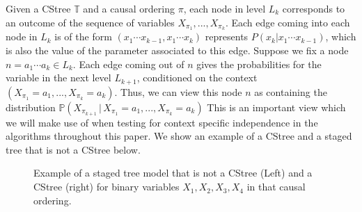 \documentclass{tufte-book}
\begin{document}
\begin{Definition}
Given a CStree \(\mathbb{T}\) and a causal ordering \(\pi\), each node in level \(L_k\) corresponds to an outcome of the sequence of variables \(X_{\pi_1},...,X_{\pi_k}\). Each edge coming into each node in \(L_k\) is of the form \((x_1\cdots x_{k-1},x_1\cdots x_k)\) represents \(P(x_{k}|x_1 \cdots x_{k-1})\), which is also the value of the parameter associated to this edge. Suppose we fix a node \(n = a_1\cdots a_k \in L_k\). Each edge coming out of \(n\) gives the probabilities for the variable in the next level \(L_{k+1}\), conditioned on the context \((X_{\pi_1}=a_1,...,X_{\pi_k}=a_k)\). Thus, we can view this node \(n\) as containing the distribution \(\mathbb{P}(X_{\pi_{k+1}}\,|\, X_{\pi_1}=a_1,...,X_{\pi_k}=a_k)\) This is an important view which we will make use of when testing for context specific independence in the algorithms throughout this paper. We show an example of a CStree and a staged tree that is not a CStree below.



\begin{figure}[!h]\label{fig:cstreestagedtree}
   \begin{floatrow}
%
\caption{Example of a staged tree model that is not a CStree (Left) and a CStree (right) for binary variables $X_1,X_2,X_3,X_4$ in that causal ordering.}
        
   \end{floatrow}
\end{figure}


\end{Definition}
\end{document}

